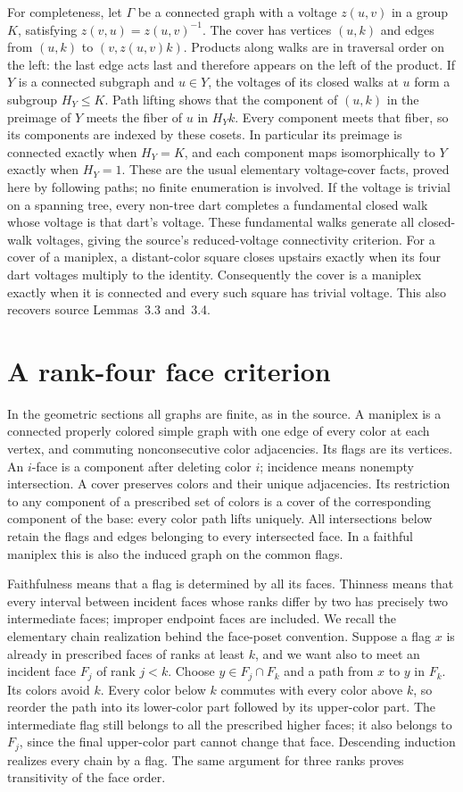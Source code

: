 \documentclass[a4paper,11pt]{article}
\begin{document}
For completeness, let $\Gamma$ be a connected graph with a voltage
$z(u,v)$ in a group $K$, satisfying $z(v,u)=z(u,v)^{-1}$. The cover has
vertices $(u,k)$ and edges from $(u,k)$ to $(v,z(u,v)k)$. Products along
walks are in traversal order on the left: the last edge acts last and
therefore appears on the left of the product. If $Y$ is a connected
subgraph and $u\in Y$, the voltages of its closed walks at $u$ form a
subgroup $H_Y\leq K$. Path lifting shows that the component of $(u,k)$
in the preimage of $Y$ meets the fiber of $u$ in $H_Yk$. Every component
meets that fiber, so its components are indexed by these cosets.
In particular its preimage is connected exactly when $H_Y=K$, and each
component maps isomorphically to $Y$ exactly when $H_Y=1$. These are the
usual elementary voltage-cover facts, proved here by following paths;
no finite enumeration is involved. If the voltage is trivial on a spanning
tree, every non-tree dart completes a fundamental closed walk whose voltage
is that dart's voltage. These fundamental walks generate all closed-walk
voltages, giving the source's reduced-voltage connectivity criterion.
For a cover of a maniplex, a distant-color square closes upstairs exactly
when its four dart voltages multiply to the identity. Consequently the
cover is a maniplex exactly when it is connected and every such square
has trivial voltage. This also recovers source Lemmas~3.3 and~3.4.

\section{A rank-four face criterion}
In the geometric sections all graphs are finite, as in the source.
A maniplex is a connected properly colored simple graph with one edge of every
color at each vertex, and commuting nonconsecutive color adjacencies.
Its flags are its vertices. An $i$-face is a component after deleting
color $i$; incidence means nonempty intersection. A cover preserves
colors and their unique adjacencies. Its restriction to any component
of a prescribed set of colors is a cover of the corresponding component
of the base: every color path lifts uniquely. All intersections below
retain the flags and edges belonging to every intersected face. In a
faithful maniplex this is also the induced graph on the common flags.

Faithfulness means that a flag is determined by all its faces. Thinness
means that every interval between incident faces whose ranks differ by two
has precisely two intermediate faces; improper endpoint faces are included.
We recall the elementary chain realization behind the face-poset convention.
Suppose a flag $x$ is already in prescribed faces of ranks at least $k$, and
we want also to meet an incident face $F_j$ of rank $j<k$. Choose
$y\in F_j\cap F_k$ and a path from $x$ to $y$ in $F_k$. Its colors avoid
$k$. Every color below $k$ commutes with every color above $k$, so reorder
the path into its lower-color part followed by its upper-color part. The
intermediate flag still belongs to all the prescribed higher faces; it
also belongs to $F_j$, since the final upper-color part cannot change that
face. Descending induction realizes every chain by a flag. The same argument
for three ranks proves transitivity of the face order.
\end{document}
